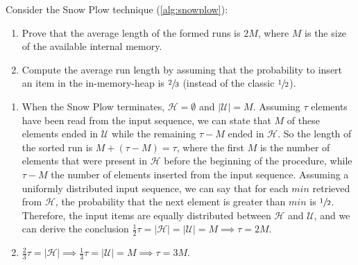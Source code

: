 \exercise

Consider the Snow Plow technique (\autoref{alg:snowplow}):
%
\begin{enumerate}

  \item Prove that the average length of the formed runs is $2M$, where $M$ is
  the size of the available internal memory.

  \item Compute the average run length by assuming that the probability to
  insert an item in the in-memory-heap is $\sfrac{2}{3}$ (instead of the classic
  $\sfrac{1}{2}$).

\end{enumerate}

\solution

\begin{enumerate}

  \item When the Snow Plow terminates, $\mathcal{H} = \emptyset$ and
  $|\mathcal{U}| = M$. Assuming $\tau$ elements have been read from the input
  sequence, we can state that $M$ of these elements ended in $\mathcal{U}$ while
  the remaining $\tau - M$ ended in $\mathcal{H}$. So the length of the sorted
  run is $M + (\tau - M) = \tau$, where the first $M$ is the number of elements
  that were present in $\mathcal{H}$ before the beginning of the procedure,
  while $\tau - M$ the number of elements inserted from the input sequence.
  Assuming a uniformly distributed input sequence, we can say that for each
  $min$ retrieved from $\mathcal{H}$, the probability that the next element is
  greater than $min$ is $\sfrac{1}{2}$. Therefore, the input items are equally
  distributed between $\mathcal{H}$ and $\mathcal{U}$, and we can derive the
  conclusion $\frac{1}{2}\tau = |\mathcal{H}| = |\mathcal{U}| = M \implies \tau
  = 2M$.

  \item $\frac{2}{3}\tau = |\mathcal{H}| \implies \frac{1}{3}\tau =
  |\mathcal{U}| = M \implies \tau = 3M$.

\end{enumerate}
